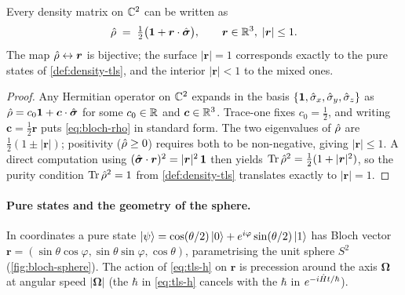 \begin{statement}
\label{stmt:bloch}
Every density matrix on $\mathbb{C}^2$ can be written as
\begin{equation}
\label{eq:bloch-rho}
\hat{\rho} \;=\; \tfrac12\bigl(\mathbf{1} + \bm{r}\cdot\hat{\bm{\sigma}}\bigr),
\qquad
\bm{r}\in\mathbb{R}^3,\;|\bm{r}|\leq1.
\end{equation}
The map $\hat{\rho}\leftrightarrow\bm{r}$ is bijective; the surface
$|\bm{r}|=1$ corresponds exactly to the pure states of
\cref{def:density-tls}, and the interior $|\bm{r}|<1$ to the mixed
ones.
\end{statement}

\begin{proof}
Any Hermitian operator on $\mathbb{C}^2$ expands in the basis
$\{\mathbf{1},\hat\sigma_x,\hat\sigma_y,\hat\sigma_z\}$ as
$\hat{\rho}=c_0\mathbf{1}+\bm{c}\cdot\hat{\bm{\sigma}}$ for some $c_0\in\mathbb{R}$
and $\bm{c}\in\mathbb{R}^3$. Trace-one fixes
$c_0=\tfrac12$, and writing $\bm{c}=\tfrac12\bm{r}$ puts
\cref{eq:bloch-rho} in standard form.
The two eigenvalues of $\hat{\rho}$ are $\tfrac12(1\pm|\bm{r}|)$;
positivity ($\hat{\rho}\geq0$) requires both to be non-negative,
giving $|\bm{r}|\leq1$. A direct computation using
$(\hat{\bm{\sigma}}\cdot\bm{r})^2=|\bm{r}|^2\,\mathbf{1}$ then yields
$\operatorname{Tr}\hat{\rho}^2=\tfrac12(1+|\bm{r}|^2)$, so the purity condition
$\operatorname{Tr}\hat{\rho}^2=1$ from \cref{def:density-tls} translates exactly
to $|\bm{r}|=1$.
\end{proof}

\paragraph{Pure states and the geometry of the sphere.}
In coordinates a pure state $\ket{\psi}=\cos(\theta/2)\ket{0}+
e^{i\varphi}\sin(\theta/2)\ket{1}$ has Bloch vector
$\bm{r}=(\sin\theta\cos\varphi,\sin\theta\sin\varphi,\cos\theta)$,
parametrising the unit sphere $S^2$ (\cref{fig:bloch-sphere}). The
action of \cref{eq:tls-h} on $\bm{r}$ is precession around the axis
$\bm{\Omega}$ at angular speed $|\bm{\Omega}|$ (the $\hbar$ in
\cref{eq:tls-h} cancels with the $\hbar$ in $e^{-i\hat{H}t/\hbar}$).

